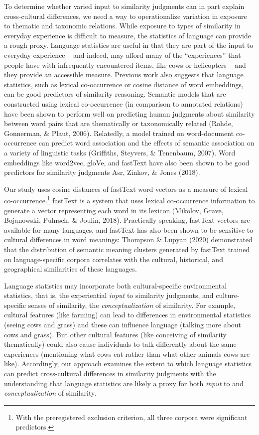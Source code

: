 \documentclass[10pt, letterpaper]{article}
\begin{document}
To determine whether varied input to similarity judgments can in part
explain cross-cultural differences, we need a way to operationalize
variation in exposure to thematic and taxonomic relations. While
exposure to types of similarity in everyday experience is difficult to
measure, the statistics of language can provide a rough proxy. Language
statistics are useful in that they are part of the input to everyday
experience -- and indeed, may afford many of the ``experiences'' that
people have with infrequently encountered items, like cows or
helicopters -- and they provide an accessible measure. Previous work
also suggests that language statistics, such as lexical co-occurrence or
cosine distance of word embeddings, can be good predictors of similarity
reasoning. Semantic models that are constructed using lexical
co-occurrence (in comparison to annotated relations) have been shown to
perform well on predicting human judgments about similarity between word
pairs that are thematically or taxonomically related (Rohde, Gonnerman,
\& Plaut, 2006). Relatedly, a model trained on word-document
co-occurrence can predict word association and the effects of semantic
association on a variety of linguistic tasks (Griffiths, Steyvers, \&
Tenenbaum, 2007). Word embeddings like word2vec, gloVe, and fastText
have also been shown to be good predictors for similarity judgments Asr,
Zinkov, \& Jones (2018).

Our study uses cosine distances of fastText word vectors as a measure of
lexical co-occurrence.\footnote{With the preregistered exclusion
  criterion, all three corpora were significant predictors.} fastText is
a system that uses lexical co-occurrence information to generate a
vector representing each word in its lexicon (Mikolov, Grave,
Bojanowski, Puhrsch, \& Joulin, 2018). Practically speaking, fastText
vectors are available for many languages, and fastText has also been
shown to be sensitive to cultural differences in word meanings: Thompson
\& Lupyan (2020) demonstrated that the distribution of semantic meaning
clusters generated by fastText trained on language-specific corpora
correlates with the cultural, historical, and geographical similarities
of these languages.

Language statistics may incorporate both cultural-specific environmental
statistics, that is, the experiential \emph{input} to similarity
judgments, and culture-specific senses of similarity, the
\emph{conceptualization} of similarity. For example, cultural features
(like farming) can lead to differences in environmental statistics
(seeing cows and grass) and these can influence language (talking more
about cows and grass). But other cultural features (like conceiving of
similarity thematically) could also cause individuals to talk
differently about the same experiences (mentioning what cows eat rather
than what other animals cows are like). Accordingly, our approach
examines the extent to which language statistics can predict
cross-cultural differences in similarity judgments with the
understanding that language statistics are likely a proxy for both
\emph{input} to and \emph{conceptualization} of similarity.
\end{document}
